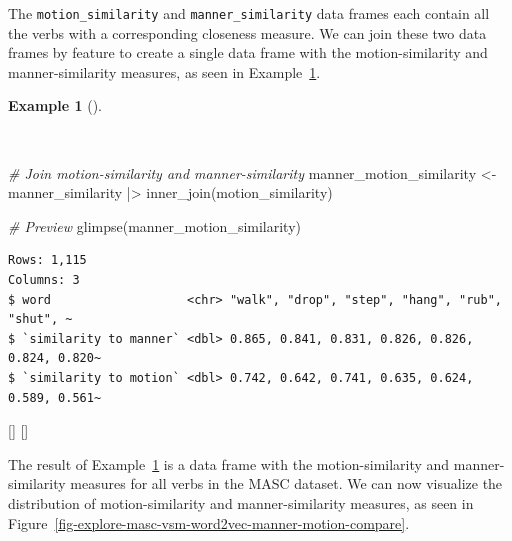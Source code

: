 \documentclass[
  letterpaper,
  krantz1]{latex/krantz-mod}
\newenvironment{Shaded}{\begin{snugshade}}{\end{snugshade}}
\newcommand{\CommentTok}[1]{\textcolor[rgb]{0.00,0.00,0.00}{\textit{#1}}}
\newcommand{\FunctionTok}[1]{\textcolor[rgb]{0.00,0.00,0.00}{#1}}
\newcommand{\NormalTok}[1]{\textcolor[rgb]{0.00,0.00,0.00}{#1}}
\newcommand{\OtherTok}[1]{\textcolor[rgb]{0.00,0.00,0.00}{#1}}
\newcommand{\SpecialCharTok}[1]{\textcolor[rgb]{0.00,0.00,0.00}{#1}}
\newcommand{\cindex}[1]{%
  \StrSubstitute{#1}{_}{\_}[\temp]%
  \index{\temp}%
}
\theoremstyle{definition}
\theoremstyle{definition}
\newtheorem{example}{Example}[chapter]
\theoremstyle{remark}
\begin{document}
The \texttt{motion\_similarity} and \texttt{manner\_similarity} data
frames each contain all the verbs with a corresponding closeness
measure. We can join these two data frames by feature to create a single
data frame with the motion-similarity and manner-similarity measures, as
seen in Example~\ref{exm-explore-masc-vsm-word2vec-manner-motion}.

\begin{example}[]\protect\hypertarget{exm-explore-masc-vsm-word2vec-manner-motion}{}\label{exm-explore-masc-vsm-word2vec-manner-motion}

~

\begin{Shaded}
\begin{Highlighting}[numbers=left,,]
\CommentTok{\# Join motion{-}similarity and manner{-}similarity}
\NormalTok{manner\_motion\_similarity }\OtherTok{\textless{}{-}}
\NormalTok{  manner\_similarity }\SpecialCharTok{|\textgreater{}}
  \FunctionTok{inner\_join}\NormalTok{(motion\_similarity)}

\CommentTok{\# Preview}
\FunctionTok{glimpse}\NormalTok{(manner\_motion\_similarity)}
\end{Highlighting}
\end{Shaded}

\begin{verbatim}
Rows: 1,115
Columns: 3
$ word                   <chr> "walk", "drop", "step", "hang", "rub", "shut", ~
$ `similarity to manner` <dbl> 0.865, 0.841, 0.831, 0.826, 0.826, 0.824, 0.820~
$ `similarity to motion` <dbl> 0.742, 0.642, 0.741, 0.635, 0.624, 0.589, 0.561~
\end{verbatim}

 \cindex{inner_join()}\cindex{glimpse()}

\end{example}

The result of Example~\ref{exm-explore-masc-vsm-word2vec-manner-motion}
is a data frame with the motion-similarity and manner-similarity
measures for all verbs in the MASC dataset. We can now visualize the
distribution of motion-similarity and manner-similarity measures, as
seen in
Figure~\ref{fig-explore-masc-vsm-word2vec-manner-motion-compare}.
\end{document}
